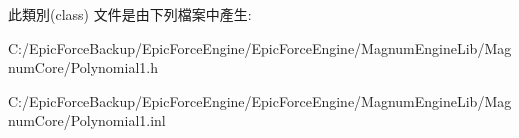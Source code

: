 此類別(class) 文件是由下列檔案中產生\+:\begin{DoxyCompactItemize}
\item 
C\+:/\+Epic\+Force\+Backup/\+Epic\+Force\+Engine/\+Epic\+Force\+Engine/\+Magnum\+Engine\+Lib/\+Magnum\+Core/Polynomial1.\+h\item 
C\+:/\+Epic\+Force\+Backup/\+Epic\+Force\+Engine/\+Epic\+Force\+Engine/\+Magnum\+Engine\+Lib/\+Magnum\+Core/Polynomial1.\+inl\end{DoxyCompactItemize}
